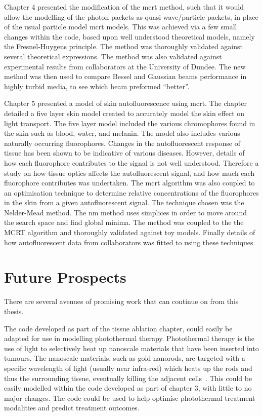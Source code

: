 \medskip

Chapter 4 presented the modification of the \gls*{mcrt} method, such that it would allow the modelling of the photon packets as quasi-wave/particle packets, in place of the usual particle model \gls*{mcrt} models.
This was achieved via a few small changes within the code, based upon well understood theoretical models, namely the Fresnel-Huygens principle.
The method was thoroughly validated against several theoretical expressions.
The method was also validated against experimental results from collaborators at the University of Dundee.
The new method was then used to compare Bessel and Gaussian beams performance in highly turbid media, to see which beam preformed ``better''.
\medskip

Chapter 5 presented a model of skin autofluorescence using \gls*{mcrt}.
The chapter detailed a five layer skin model created to accurately model the skin effect on light transport.
The five layer model included the various chromophores found in the skin such as blood, water, and melanin.
The model also includes various naturally occurring fluorophores.
Changes in the autofluorescent response of tissue has been shown to be indicative of various diseases.
However, details of how each fluorophore contributes to the signal is not well understood.
Therefore a study on how tissue optics affects the autofluorescent signal, and how much each fluorophore contributes was undertaken.
The \gls*{mcrt} algorithm was also coupled to an optimisation technique to determine relative concentrations of the fluorophores in the skin from a given autofluorescent signal.
The technique chosen was the Nelder-Mead method.
The \gls*{nm} method uses simplices in order to move around the search space and find global minima.
The method was coupled to the the MCRT algorithm and thoroughly validated against toy models.
Finally details of how autofluorescent data from collaborators was fitted to using these techniques.

\section{Future Prospects}

There are several avenues of promising work that can continue on from this thesis.

The code developed as part of the tissue ablation chapter, could easily be adapted for use in modelling photothermal therapy.
Photothermal therapy is the use of light to selectively heat up nanoscale materials that have been inserted into tumours.
The nanoscale materials, such as gold nanorods, are targeted with a specific wavelength of light (usually near infra-red) which heats up the rods and thus the surrounding tissue, eventually killing the adjacent cells~\cite{singh2016application,gallina2016aptamer}.
This could be easily modelled within the code developed as part of chapter 3, with little to no major changes.
The code could be used to help optimise photothermal treatment modalities and predict treatment outcomes.

